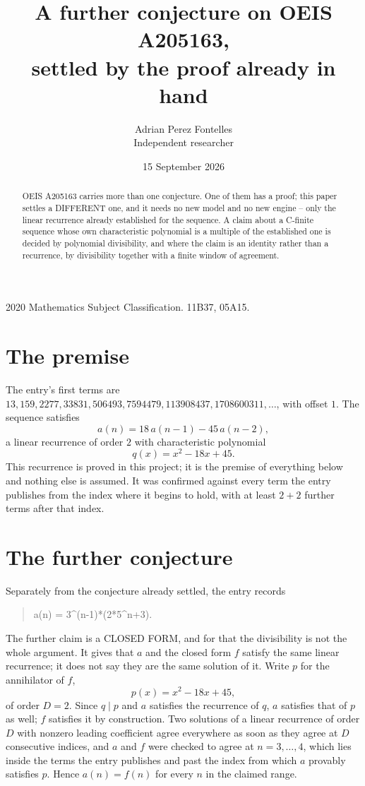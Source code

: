 \documentclass[11pt,a4paper]{article}
\title{A further conjecture on OEIS A205163,\\ \large settled by the proof already in hand}
\author{Adrian Perez Fontelles\\ \small Independent researcher}
\date{15 September 2026}
\theoremstyle{plain}
\theoremstyle{definition}
\begin{document}
\maketitle

\begin{abstract}
OEIS A205163 carries more than one conjecture. One of them has a proof; this paper settles a
DIFFERENT one, and it needs no new model and no new engine -- only the linear recurrence already
established for the sequence. A claim about a C-finite sequence whose own characteristic
polynomial is a multiple of the established one is decided by polynomial divisibility, and where
the claim is an identity rather than a recurrence, by divisibility together with a finite window
of agreement.
\end{abstract}

\noindent\small 2020 Mathematics Subject Classification. 11B37, 05A15.\normalsize

\section{The premise}

The entry's first terms are $13, 159, 2277, 33831, 506493, 7594479, 113908437, 1708600311,\dots$, with offset $1$. The sequence satisfies
\[
  a(n)=18\,a(n-1) - 45\,a(n-2) ,
\]
a linear recurrence of order $2$ with characteristic polynomial
\[
  q(x)=x^{2} - 18 x + 45 .
\]
This recurrence is proved in this project; it is the premise of everything below and nothing else is assumed.
It was confirmed against every term the entry publishes from the index where it begins to hold,
with at least $2+2$ further terms after that index.

\section{The further conjecture}

Separately from the conjecture already settled, the entry records

\begin{quote}\raggedright a(n) = 3\^{}(n-1)*(2*5\^{}n+3).\end{quote}

The further claim is a CLOSED FORM, and for that the divisibility is not the whole argument. It
gives that $a$ and the closed form $f$ satisfy the same linear recurrence; it does not say they
are the same solution of it. Write $p$ for the annihilator of $f$,
\[
  p(x)=x^{2} - 18 x + 45 ,
\]
of order $D=2$. Since $q\mid p$ and $a$ satisfies the recurrence of $q$, $a$ satisfies that of
$p$ as well; $f$ satisfies it by construction. Two solutions of a linear recurrence of order $D$
with nonzero leading coefficient agree everywhere as soon as they agree at $D$ consecutive
indices, and $a$ and $f$ were checked to agree at $n=3,\dots,4$,
which lies inside the terms the entry publishes and past the index from which $a$ provably
satisfies $p$. Hence $a(n)=f(n)$ for every $n$ in the claimed range.
\end{document}
